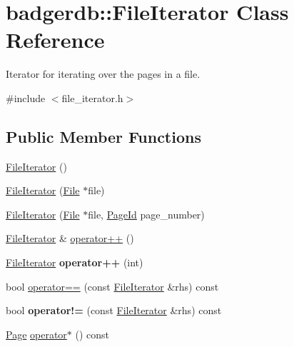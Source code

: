 \hypertarget{classbadgerdb_1_1FileIterator}{\section{badgerdb\-:\-:File\-Iterator Class Reference}
\label{classbadgerdb_1_1FileIterator}
}


Iterator for iterating over the pages in a file.  




{\ttfamily \#include $<$file\-\_\-iterator.\-h$>$}

\subsection*{Public Member Functions}
\begin{DoxyCompactItemize}
\item 
\hyperlink{classbadgerdb_1_1FileIterator_a99bd5c0e0fac0493f9664409219ca88e}{File\-Iterator} ()
\item 
\hyperlink{classbadgerdb_1_1FileIterator_ad286fc916be769b1bea154603b83ece0}{File\-Iterator} (\hyperlink{classbadgerdb_1_1File}{File} $\ast$file)
\item 
\hyperlink{classbadgerdb_1_1FileIterator_afabd7eecd315a85f9eb602f71c6f88e3}{File\-Iterator} (\hyperlink{classbadgerdb_1_1File}{File} $\ast$file, \hyperlink{namespacebadgerdb_a1f49e404293bf4240756b89b53b1587a}{Page\-Id} page\-\_\-number)
\item 
\hyperlink{classbadgerdb_1_1FileIterator}{File\-Iterator} \& \hyperlink{classbadgerdb_1_1FileIterator_a6fa0f1cef8b46bb933ce6f000276ab52}{operator++} ()
\item 
\hypertarget{classbadgerdb_1_1FileIterator_a997a4dc0a213e33384f82891135e41ec}{\hyperlink{classbadgerdb_1_1FileIterator}{File\-Iterator} {\bfseries operator++} (int)}\label{classbadgerdb_1_1FileIterator_a997a4dc0a213e33384f82891135e41ec}

\item 
bool \hyperlink{classbadgerdb_1_1FileIterator_a373f648963527f2dd259980434686645}{operator==} (const \hyperlink{classbadgerdb_1_1FileIterator}{File\-Iterator} \&rhs) const 
\item 
\hypertarget{classbadgerdb_1_1FileIterator_a9e1a5e7e5c0b2cc2861e7b3bf856739a}{bool {\bfseries operator!=} (const \hyperlink{classbadgerdb_1_1FileIterator}{File\-Iterator} \&rhs) const }\label{classbadgerdb_1_1FileIterator_a9e1a5e7e5c0b2cc2861e7b3bf856739a}

\item 
\hyperlink{classbadgerdb_1_1Page}{Page} \hyperlink{classbadgerdb_1_1FileIterator_a425810cc9834e0a3c97da76cd0a6b10a}{operator$\ast$} () const 
\end{DoxyCompactItemize}


